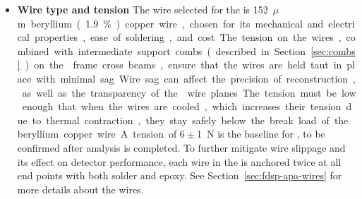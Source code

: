 \begin{itemize}
\begin{comment}
\begin{dunetable}[APA wire plane nominal bias voltages]{lr}{tab:bias}
{Baseline bias voltages for \dword{apa} wire layers for a 100\% ionization electron transparency as they traveling through the grid and induction wire planes. These values were calculated by COMSOL software~\cite{COMSOL} and confirmed by analytical calculations based on the conformal representation theory as well as dedicated data from ProtoDUNE.} 
\textbf{Anode Plane} & \textbf{Bias Voltage} \\ \toprowrule
$G$ - Grid & \SI{-665}{V} \\ \colhline
$U$ - Induction & \SI{-370}{V{}} \\ \colhline
$V$ - Induction & \SI{0}{V} \\ \colhline
$X$ - Collection & \SI{820}{V} \\ \colhline
Grounding Mesh & \SI{0}{V} \\ \colhline
\end{dunetable}
\begin{dunefigure}[Field line simulation around wire planes]{fig:apa-fields}
{Field lines and resulting signal shapes on the APA induction and collection wires.}
\texttt{[image: sp-apa-drawing-wire-field-signals.png]}
\end{dunefigure}
\end{comment}


\item \textbf{Wire type and tension}  The wire selected for the  is \SI{152}{$\mu$m} beryllium (\num{1.9}\%) copper wire, %
chosen for its mechanical and electrical properties, ease of soldering, and cost.  The tension on the wires, combined with intermediate support combs (described in Section~\ref{sec:combs}) on the  frame cross beams, ensure that the wires are held taut in place with minimal sag.  Wire sag can affect the precision of reconstruction, as well as the transparency of the  wire planes.  The tension must be low enough that when the wires are cooled, which increases their tension due to thermal contraction, they stay safely below the break load of the beryllium copper wire.  A tension of $6\pm$\SI{1}{N} is the baseline for , to be confirmed after  analysis is completed.  To further mitigate wire slippage and its effect on detector performance, each wire in the  is anchored twice at all end points with both solder and epoxy.  See Section~\ref{sec:fdsp-apa-wires} for more details about the wires.

\end{itemize}

